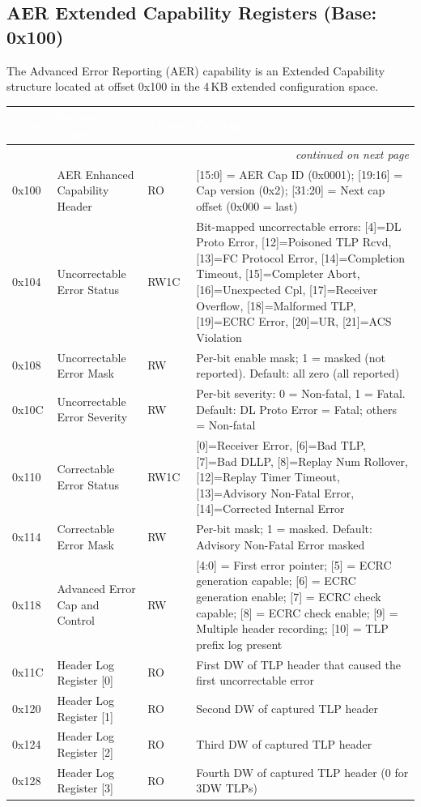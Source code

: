 \documentclass[11pt,a4paper]{article}
\newcommand{\theadcell}[1]{%
  \cellcolor{tablehead}\textcolor{white}{\textbf{#1}}}
\begin{document}
\subsection{AER Extended Capability Registers (Base: 0x100)}

The Advanced Error Reporting (AER) capability is an Extended Capability structure
located at offset 0x100 in the 4\,KB extended configuration space.

\begin{longtable}{p{2.5cm}p{4.5cm}p{1.5cm}p{5.5cm}}
  \toprule
  \theadcell{Offset} & \theadcell{Register Name} & \theadcell{Access} & \theadcell{Description} \\
  \midrule
  \endhead
  \multicolumn{4}{r}{\small\itshape continued on next page} \\
  \endfoot
  \endlastfoot
  0x100 & AER Enhanced Capability Header & RO & [15:0] = AER Cap ID (0x0001); [19:16] = Cap version (0x2); [31:20] = Next cap offset (0x000 = last) \\
  0x104 & Uncorrectable Error Status     & RW1C & Bit-mapped uncorrectable errors: [4]=DL Proto Error, [12]=Poisoned TLP Rcvd, [13]=FC Protocol Error, [14]=Completion Timeout, [15]=Completer Abort, [16]=Unexpected Cpl, [17]=Receiver Overflow, [18]=Malformed TLP, [19]=ECRC Error, [20]=UR, [21]=ACS Violation \\
  0x108 & Uncorrectable Error Mask       & RW   & Per-bit enable mask; 1 = masked (not reported). Default: all zero (all reported) \\
  0x10C & Uncorrectable Error Severity   & RW   & Per-bit severity: 0 = Non-fatal, 1 = Fatal. Default: DL Proto Error = Fatal; others = Non-fatal \\
  0x110 & Correctable Error Status       & RW1C & [0]=Receiver Error, [6]=Bad TLP, [7]=Bad DLLP, [8]=Replay Num Rollover, [12]=Replay Timer Timeout, [13]=Advisory Non-Fatal Error, [14]=Corrected Internal Error \\
  0x114 & Correctable Error Mask         & RW   & Per-bit mask; 1 = masked. Default: Advisory Non-Fatal Error masked \\
  0x118 & Advanced Error Cap and Control & RW   & [4:0] = First error pointer; [5] = ECRC generation capable; [6] = ECRC generation enable; [7] = ECRC check capable; [8] = ECRC check enable; [9] = Multiple header recording; [10] = TLP prefix log present \\
  0x11C & Header Log Register [0]        & RO   & First DW of TLP header that caused the first uncorrectable error \\
  0x120 & Header Log Register [1]        & RO   & Second DW of captured TLP header \\
  0x124 & Header Log Register [2]        & RO   & Third DW of captured TLP header \\
  0x128 & Header Log Register [3]        & RO   & Fourth DW of captured TLP header (0 for 3DW TLPs) \\
  \bottomrule
\end{longtable}
\end{document}
